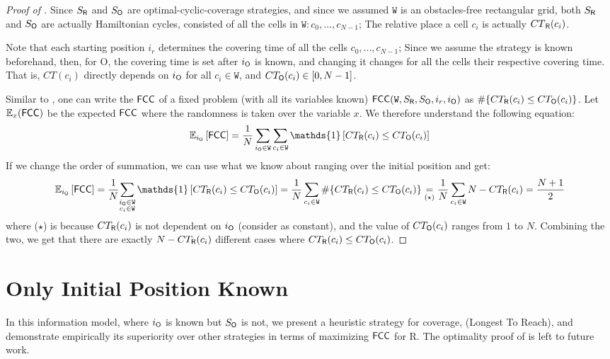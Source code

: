 \documentclass[letterpaper, 10 pt, conference]{ieeeconf}  %
\theoremstyle{definition}
\newcommand{\rob}{{{\sf R}}\xspace}
\newcommand{\opp}{{{\sf O}}\xspace}
\newcommand{\w}{{{\texttt W}}\xspace}
\newcommand{\fcc}{{{\sf{FCC}}}\xspace}
\newcommand{\ltr}{{{\sf{LTR}}}\xspace}
\begin{document}
\begin{proof}[Proof of ]
Since $S_{\rob}$ and $S_{\opp}$ are optimal-cyclic-coverage strategies, and since we assumed $\w$ is an obstacles-free rectangular grid, both $S_{\rob}$ and $S_\opp$ are actually Hamiltonian cycles, consisted of all the cells in $\w:c_0,...,c_{N-1}$; The relative place a cell $c_i$ is actually  ${CT}_{\rob}(c_i)$. 

Note that each starting position $i_r$ determines the covering time of all the cells $c_0,...,c_{N-1}$; Since we assume the strategy is known beforehand, then, for \opp, the covering time is set after $i_\opp$ is known, and changing it changes for all the cells their respective covering time. That is, $CT\left(c_i\right)$ directly depends on $i_\opp$ for all $c_i\in\w$, and $CT_{\opp}(c_i)\in [0,N-1]$.

Similar to , one can write the $\fcc$ of a fixed problem (with all its variables known) $\fcc(\w,S_{\rob},S_{\opp},i_r,i_\opp)$ as $\# \lbrace CT_{\rob}(c_i) \le CT_{\opp}(c_i)\rbrace$. Let $\mathbb{E}_{x}(\fcc)$ be the expected $\fcc$ where the randomness is taken over the variable $x$. We therefore understand the following equation:
\[\mathbb{E}_{i_\opp}\left[\fcc\right]=
\frac{1}{N}\sum_{i_\opp\in \w}{\sum_{c_i\in \w}{\mathds{1}\left[CT_{\rob}(c_i) \le CT_{\opp}(c_i)\right]}}\]
If we change the order of summation, we can use what we know about ranging over the initial position and get:
\begin{dmath*}[compact]
\mathbb{E}_{i_\opp}\left[\fcc\right]=
\frac{1}{N}{\sum_{\substack{i_\opp\in \w \\c_i\in \w}}{\mathds{1}\left[CT_{\rob}(c_i) \le CT_{\opp}(c_i)\right]}}=
\frac{1}{N}\sum_{c_i\in \w}{\# \lbrace CT_{\rob}(c_i) \le CT_{\opp}(c_i)\rbrace} \underset{(\star)}{=} 
\frac{1}{N}\sum_{c_i\in \w}{N-CT_{\rob}(c_i)}=
\frac{N+1}{2}
\end{dmath*}
where ($\star$) is because $CT_{\rob}(c_i)$ is not dependent on $i_{\opp}$ (consider as constant), and the value of $CT_{\opp}(c_i)$ ranges from $1$ to $N$. 
Combining the two, we get that there are exactly $N-CT_{\rob}(c_i)$ different cases where $CT_{\rob}(c_i) \leq CT_{\opp}(c_i)$.

\end{proof}

\section{Only Initial Position Known}
In this information model, where $i_{\opp}$ is known but $S_{\opp}$ is not, we present a heuristic strategy for coverage, \ltr (Longest To Reach), and demonstrate empirically its superiority over other strategies in terms of maximizing $\fcc$ for \rob. 
The optimality proof of \ltr is left to future work.
\end{document}

